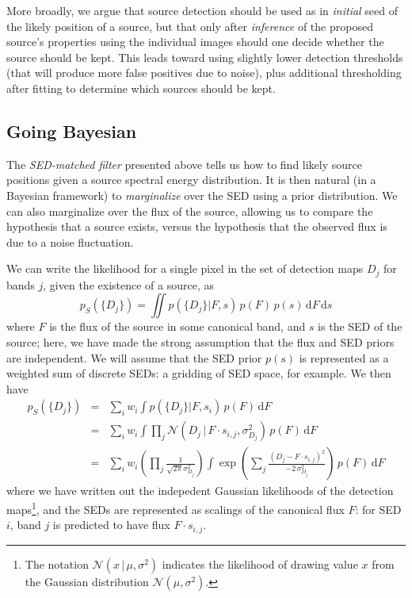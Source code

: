 \documentclass[11pt,letterpaper,linenumbers]{aastex63}
\newcommand{\gaussianN}{\mathcal{N}}
\newcommand{\gaussian}[1]{\gaussianN\!\left(#1\right)}
\newcommand{\dd}{\mathrm{d}}
\begin{document}
More broadly, we argue that source detection should be used as in
\emph{initial} seed of the likely position of a source, but that only
after \emph{inference} of the proposed source's properties using the
individual images should one decide whether the source should be kept.
This leads toward using slightly lower detection thresholds (that will
produce more false positives due to noise), plus additional
thresholding after fitting to determine which sources should be kept.



\subsection{Going Bayesian}

The \emph{SED-matched filter} presented above tells us how to find
likely source positions given a source spectral energy distribution.
It is then natural (in a Bayesian framework) to \emph{marginalize}
over the SED using a prior distribution.  We can also marginalize over
the flux of the source, allowing us to compare the hypothesis that a
source exists, versus the hypothesis that the observed flux is due to
a noise fluctuation.

We can write the likelihood for a single pixel in the set of detection
maps $D_j$ for bands $j$, given the existence of a source, as
\begin{equation}
  p_S(\{ D_j \}) = \iint p(\{ D_j \} | F, s) \, p(F) \, p(s) \, \dd F \, \dd s
\end{equation}
where $F$ is the flux of the source in some canonical band, and $s$ is
the SED of the source; here, we have made the strong assumption that the
flux and SED priors are independent.  We will assume that the SED prior $p(s)$ is
represented as a weighted sum of discrete SEDs: a gridding of SED
space, for example.  We then have
\begin{eqnarray}
  p_S(\{ D_j \})
  &=&
  \sum_{i} w_i \int p(\{ D_j \} | F, s_i) \, p(F) \, \dd F
  \\
  &=&
  \sum_i w_i \int \prod_j \gaussian{D_j \,|\, F \cdot s_{i,j}, \sigma_{D_j}^2} \, p(F) \, \dd F
  \\
  &=&
  \sum_i w_i 
  \left( \prod_j \frac{1}{\sqrt{2 \pi} \sigma_{D_j}^2} \right)
  \int 
    \exp{ \left( \sum_j \frac{(D_j - F \cdot s_{i,j})^2}{-2 \, \sigma_{D_j}^2} \right) }
    \, p(F) \, \dd F
\end{eqnarray}
%
where we have written out the indepedent Gaussian likelihoods of the
detection maps\footnote{The notation $\gaussian{x \,|\, \mu, \sigma^2}$ indicates the likelihood
  of drawing value $x$ from the Gaussian distribution $\gaussian{\mu, \sigma^2}$.},
and the SEDs are represented as scalings of the
canonical flux $F$: for SED $i$, band $j$ is predicted to have flux $F
\cdot s_{i,j}$.
\end{document}
